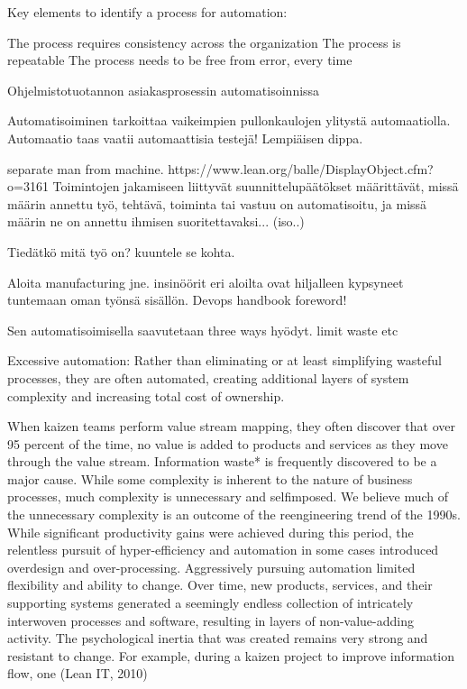 \documentclass[finnish,12pt,a4paper,pdftex]{article}
\begin{document}
Key elements to identify a process for automation:

The process requires consistency across the organization
The process is repeatable
The process needs to be free from error, every time

Ohjelmistotuotannon asiakasprosessin automatisoinnissa 

Automatisoiminen tarkoittaa vaikeimpien pullonkaulojen ylitystä automaatiolla. Automaatio taas vaatii automaattisia testejä! Lempiäisen dippa.

separate man from machine. https://www.lean.org/balle/DisplayObject.cfm?o=3161 
Toimintojen jakamiseen liittyvät suunnittelupäätökset määrittävät, missä määrin annettu työ, tehtävä, toiminta tai vastuu on automatisoitu, ja missä määrin ne on annettu ihmisen suoritettavaksi... (iso..)

Tiedätkö mitä työ on? kuuntele se kohta.

Aloita manufacturing jne. 
insinöörit eri aloilta ovat hiljalleen kypsyneet tuntemaan oman työnsä sisällön. Devops handbook foreword!

Sen automatisoimisella saavutetaan three ways hyödyt. limit waste etc

Excessive automation: Rather than eliminating or at least simplifying
wasteful processes, they are often automated, creating additional
layers of system complexity and increasing total cost of ownership.




When kaizen teams perform value stream mapping, they often discover
that over 95 percent of the time, no value is added to products and services
as they move through the value stream. Information waste* is frequently
discovered to be a major cause. While some complexity is inherent to the
nature of business processes, much complexity is unnecessary and selfimposed.
We believe much of the unnecessary complexity is an outcome of
the reengineering trend of the 1990s. While significant productivity gains
were achieved during this period, the relentless pursuit of hyper-efficiency
and automation in some cases introduced overdesign and over-processing.
Aggressively pursuing automation limited flexibility and ability to change.
Over time, new products, services, and their supporting systems generated
a seemingly endless collection of intricately interwoven processes and
software, resulting in layers of non-value-adding activity. The psychological
inertia that was created remains very strong and resistant to change.
For example, during a kaizen project to improve information flow, one (Lean IT, 2010)
\end{document}
